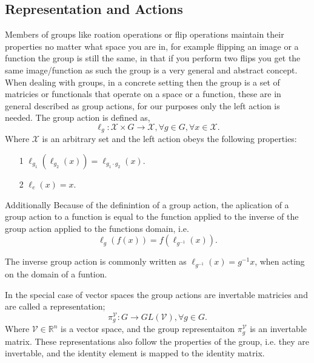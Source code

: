 \subsection{Representation and Actions}
Members of groups like roation operations or flip operations maintain their properties no matter what space you are in, for example flipping an image or a function the group is still the same, in that if you perform two flips you get the same image/function as such the group is a very general and abstract concept. When dealing with groups, in a concrete setting then the group is a set of matricies or functionals that operate on a space or a function, these are in general described as group actions, for our purposes only the left action is needed. The group action is defined as,
\begin{equation}
	\ell_g: \mathcal{X} \times G \rightarrow \mathcal{X}, \forall g \in G, \forall x \in \mathcal{X}.
\end{equation}
Where $\mathcal{X}$ is an arbitrary set and the left action obeys the following properties:
\begin{itemize}
	\item[1] $\ell_{g_1}(\ell_{g_2}(x)) = \ell_{g_1 \cdot g_2}(x)$.
	\item[2] $\ell_e(x) = x$.
\end{itemize}
Additionally Because of the definintion of a group action, the aplication of a group action to a function is equal to the function applied to the inverse of the group action applied to the functions domain, i.e.
\begin{equation}
	\ell_g(f(x)) = f(\ell_{g^{-1}}(x)).
\end{equation}

The inverse group action is commonly written as $\ell_{g^{-1}}(x) = g^{-1}x$, when acting on the domain of a funtion.

In the special case of vector spaces the group actions are invertable matricies and are called a representation;
\begin{equation}
	\pi_g^\mathcal{V}: G \rightarrow GL(\mathcal{V}), \forall g \in G.
\end{equation}
Where $\mathcal{V} \in \mathbb{R}^n$ is a vector space, and the group representaiton $\pi_g^\mathcal{V}$ is an invertable matrix. These representations also follow the properties of the group, i.e. they are invertable, and the identity element is mapped to the identity matrix.
